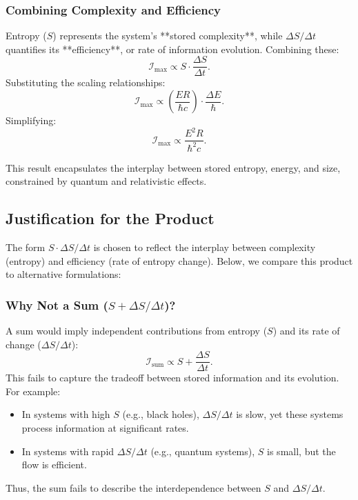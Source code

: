 \documentclass[12pt]{article}
\begin{document}
\subsubsection{Combining Complexity and Efficiency}
Entropy (\( S \)) represents the system’s **stored complexity**, while \( \Delta S / \Delta t \) quantifies its **efficiency**, or rate of information evolution. Combining these:
\[
\mathcal{I}_{\text{max}} \propto S \cdot \frac{\Delta S}{\Delta t}.
\]
Substituting the scaling relationships:
\[
\mathcal{I}_{\text{max}} \propto \left(\frac{E R}{\hbar c}\right) \cdot \frac{\Delta E}{\hbar}.
\]
Simplifying:
\[
\mathcal{I}_{\text{max}} \propto \frac{E^2 R}{\hbar^2 c}.
\]

This result encapsulates the interplay between stored entropy, energy, and size, constrained by quantum and relativistic effects.

\subsection{Justification for the Product}
The form \( S \cdot \Delta S / \Delta t \) is chosen to reflect the interplay between complexity (entropy) and efficiency (rate of entropy change). Below, we compare this product to alternative formulations:

\subsubsection{Why Not a Sum (\( S + \Delta S / \Delta t \))?}
A sum would imply independent contributions from entropy (\( S \)) and its rate of change (\( \Delta S / \Delta t \)):
\[
\mathcal{I}_{\text{sum}} \propto S + \frac{\Delta S}{\Delta t}.
\]
This fails to capture the tradeoff between stored information and its evolution. For example:
\begin{itemize}
    \item In systems with high \( S \) (e.g., black holes), \( \Delta S / \Delta t \) is slow, yet these systems process information at significant rates.
    \item In systems with rapid \( \Delta S / \Delta t \) (e.g., quantum systems), \( S \) is small, but the flow is efficient.
\end{itemize}
Thus, the sum fails to describe the interdependence between \( S \) and \( \Delta S / \Delta t \).
\end{document}
